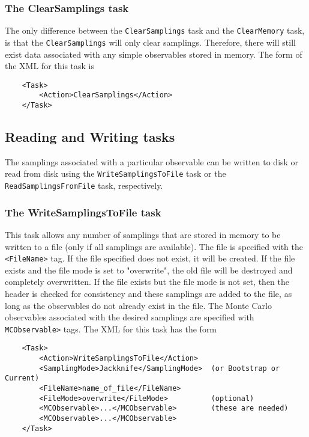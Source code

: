 \documentclass[12pt,notitlepage,letterpaper]{article}
\newcommand{\vb}{\texttt}
\begin{document}
\subsubsection{The ClearSamplings task}
The only difference between the \vb{ClearSamplings} task and
the \vb{ClearMemory} task, is that the \vb{ClearSamplings} will
only clear samplings. Therefore, there will still exist data
associated with any simple observables stored in memory.
The form of the XML for this task is
\begin{verbatim}
    <Task>
        <Action>ClearSamplings</Action>
    </Task>
\end{verbatim}

\subsection{Reading and Writing tasks}

The samplings associated with a particular observable can be
written to disk or read from disk using the
\vb{WriteSamplingsToFile} task or the \vb{ReadSamplingsFromFile} task, respectively.

\subsubsection{The WriteSamplingsToFile task}
This task allows any number of samplings that are stored in memory to be written
to a file (only if all samplings are available).
The file is specified with the \vb{<FileName>} tag.
If the file specified does not exist, it will be created. If the file
exists and the file mode is set to "overwrite", the old file will be destroyed
and completely overwritten.  If the file exists but the file mode is not set,
then the header is checked for consistency and these
samplings are added to the file, as long as the observables do
not already exist in the file.
The Monte Carlo observables associated with the desired samplings are
specified with \vb{MCObservable>} tags.
The XML for this task has the form
\begin{verbatim}
    <Task> 
        <Action>WriteSamplingsToFile</Action> 
        <SamplingMode>Jackknife</SamplingMode>  (or Bootstrap or Current) 
        <FileName>name_of_file</FileName> 
        <FileMode>overwrite</FileMode>          (optional) 
        <MCObservable>...</MCObservable>        (these are needed) 
        <MCObservable>...</MCObservable> 
    </Task>
\end{verbatim}
\end{document}
